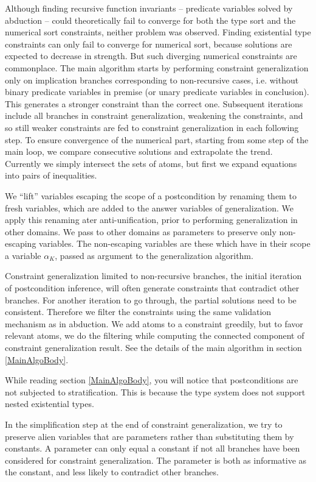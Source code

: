 \documentclass{article}
\begin{document}
Although finding recursive function invariants -- predicate variables solved
by abduction -- could theoretically fail to converge for both the type sort
and the numerical sort constraints, neither problem was observed. Finding
existential type constraints can only fail to converge for numerical sort,
because solutions are expected to decrease in strength. But such diverging
numerical constraints are commonplace. The main algorithm starts by performing
constraint generalization only on implication branches corresponding to
non-recursive cases, i.e. without binary predicate variables in premise (or
unary predicate variables in conclusion). This generates a stronger constraint
than the correct one. Subsequent iterations include all branches in constraint
generalization, weakening the constraints, and so still weaker constraints are
fed to constraint generalization in each following step. To ensure convergence
of the numerical part, starting from some step of the main loop, we compare
consecutive solutions and extrapolate the trend. Currently we simply intersect
the sets of atoms, but first we expand equations into pairs of inequalities.

We ``lift'' variables escaping the scope of a postcondition by renaming them
to fresh variables, which are added to the answer variables of generalization.
We apply this renaming ater anti-unification, prior to performing
generalization in other domains. We pass to other domains as parameters to
preserve only non-escaping variables. The non-escaping variables are these
which have in their scope a variable $\alpha_K$, passed as argument to the
generalization algorithm.

Constraint generalization limited to non-recursive branches, the initial
iteration of postcondition inference, will often generate constraints that
contradict other branches. For another iteration to go through, the partial
solutions need to be consistent. Therefore we filter the constraints using the
same validation mechanism as in abduction. We add atoms to a constraint
greedily, but to favor relevant atoms, we do the filtering while computing the
connected component of constraint generalization result. See the details of
the main algorithm in section \ref{MainAlgoBody}.

While reading section \ref{MainAlgoBody}, you will notice that postconditions
are not subjected to stratification. This is because the type system does not
support nested existential types.

In the simplification step at the end of constraint generalization, we try to
preserve alien variables that are parameters rather than substituting them by
constants. A parameter can only equal a constant if not all branches have been
considered for constraint generalization. The parameter is both as informative
as the constant, and less likely to contradict other branches.
\end{document}

